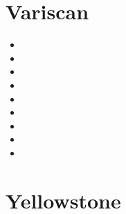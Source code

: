 
\section{Variscan}

\begin{small}
\begin{itemize}
\item[\nineteenninetynine] 
\item[\twothousandfour] 
\item[\twothousandseven] 
\item[\twothousandthirteen] 
\item[\twothousandseventeen] 
\item[\twothousandeighteen] 
\item[\twothousandtwenty] 
\item[\twothousandtwentyone] 
\item[\twothousandtwentyfive] 
\end{itemize}
\end{small}






\section{Yellowstone}

